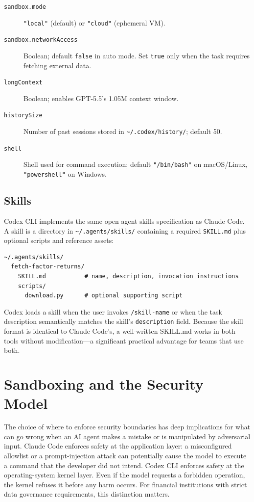 \begin{description}
  \item[\texttt{sandbox.mode}] \texttt{"local"} (default) or
        \texttt{"cloud"} (ephemeral VM).
  \item[\texttt{sandbox.networkAccess}] Boolean; default \texttt{false} in
        auto mode.  Set \texttt{true} only when the task requires fetching
        external data.
  \item[\texttt{longContext}] Boolean; enables GPT-5.5's 1.05M context window.
  \item[\texttt{historySize}] Number of past sessions stored in
        \texttt{\textasciitilde/.codex/history/}; default 50.
  \item[\texttt{shell}]  Shell used for command execution; default
        \texttt{"/bin/bash"} on macOS/Linux, \texttt{"powershell"} on Windows.
\end{description}

\subsection{Skills}
\label{app:codex:skills}

Codex CLI implements the same open agent skills specification as Claude Code.
A skill is a directory in \texttt{\textasciitilde/.agents/skills/} containing
a required \texttt{SKILL.md} plus optional scripts and reference assets:

\begin{verbatim}
~/.agents/skills/
  fetch-factor-returns/
    SKILL.md           # name, description, invocation instructions
    scripts/
      download.py      # optional supporting script
\end{verbatim}

Codex loads a skill when the user invokes \texttt{/skill-name} or when the
task description semantically matches the skill's \texttt{description} field.
Because the skill format is identical to Claude Code's, a well-written
SKILL.md works in both tools without modification---a significant practical
advantage for teams that use both.

\section{Sandboxing and the Security Model}
\label{app:codex:sandboxing}

\begin{context}
The choice of where to enforce security boundaries has deep implications for
what can go wrong when an AI agent makes a mistake or is manipulated by
adversarial input.  Claude Code enforces safety at the application layer:
a misconfigured allowlist or a prompt-injection attack can potentially
cause the model to execute a command that the developer did not intend.
Codex CLI enforces safety at the operating-system kernel layer.  Even if the
model requests a forbidden operation, the kernel refuses it before any harm
occurs.  For financial institutions with strict data governance requirements,
this distinction matters.
\end{context}

